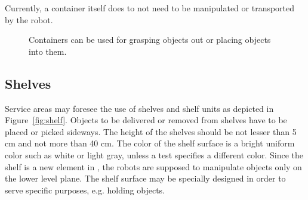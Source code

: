 Currently, a container itself does to not need to be manipulated or transported by the robot.

\begin{figure} [h!]
\begin{center}
 \hspace{1cm}
\end{center}
\caption{Containers can be used for grasping objects out or placing objects into them.}
\label{fig:containers}
\end{figure}


\subsection{Shelves}
Service areas may foresee the use of shelves and shelf units as depicted in Figure~\ref{fig:shelf}. Objects to be delivered or removed from shelves have to be placed or picked sideways. The height of the shelves should be not lesser than 5 cm and not more than 40 cm. The color of the shelf surface is a bright uniform color such as white or light gray, unless a test specifies a different color.
Since the shelf is a new element in \RCAW, the robots are supposed to manipulate objects only on the lower level plane. 
The shelf surface may be specially designed in order to serve specific purposes, e.g. holding objects.

